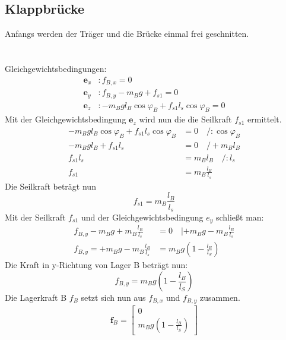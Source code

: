 \documentclass[a4paper,12p]{article}
\begin{document}
\subsection{Klappbrücke}
Anfangs werden der Träger und die Brücke einmal frei geschnitten. \\ \\

\\ Gleichgewichtsbedingungen:
\begin{align*}
	\textbf{e}_{x} &: f_{B,x} = 0 \\
	\textbf{e}_{y} &: f_{B,y} - m_Bg + f_{s1} = 0 \\
	\textbf{e}_{z} &: -m_Bgl_B\cos\varphi_B  + f_{s1}l_s\cos\varphi_B = 0
\end{align*}
Mit der Gleichgewichtsbedingung $\textbf{e}_{z}$ wird nun die die Seilkraft $f_{s1}$ ermittelt.
\begin{align*}
	-m_Bgl_B\cos\varphi_B  + f_{s1}l_s\cos\varphi_B &= 0 \quad /:\cos\varphi_B \\
	-m_Bgl_B + f_{s1}l_s &= 0 \quad /+ m_Bl_B \\
	f_{s1}l_s &= m_Bl_B \quad /:l_s\\
	f_{s1} &= m_B\frac{l_B}{l_s}
\end{align*}
Die Seilkraft beträgt nun
\begin{equation*}
	f_{s1} = m_B\frac{l_B}{l_s}
\end{equation*}
Mit der Seilkraft $f_{s1}$ und der Gleichgewichtsbedingung $e_y$ schließt man:
\begin{align*}
	f_{B,y} - m_Bg + m_B\frac{l_B}{l_s} &= 0 \quad | + m_Bg - m_B\frac{l_B}{l_s} \\
	f_{B,y} = + m_Bg - m_B\frac{l_B}{l_s} &= m_Bg \left(1 - \frac{l_B}{l_S}\right)
\end{align*}
Die Kraft in y-Richtung von Lager B beträgt nun:
\begin{equation*}
	f_{B,y} = m_Bg\left(1 - \frac{l_B}{l_S}\right)
\end{equation*}
Die Lagerkraft B $f_B$ setzt sich nun aus $f_{B,x}$ und $f_{B,y}$ zusammen.
\begin{align*}
	\textbf{f}_B = \left[ \begin{matrix}
		0 \\
		m_Bg\left(1 - \frac{l_B}{l_S}\right)
	\end{matrix}\right]
\end{align*}
\end{document}
